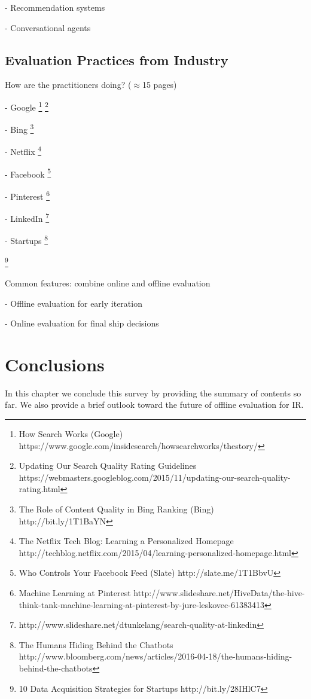 \documentclass[openany]{now} %
\newcommand{\newpar}{\bigskip\noindent}
\begin{document}
- Recommendation systems \cite{gunawardana2015evaluating}

- Conversational agents

\section{Evaluation Practices from Industry}

How are the practitioners doing? (\ensuremath{\approx}15 pages)

- Google \footnote{How Search Works (Google) https://www.google.com/insidesearch/howsearchworks/thestory/} \footnote{Updating Our Search Quality Rating Guidelines
	 https://webmasters.googleblog.com/2015/11/updating-our-search-quality-rating.html}

- Bing \footnote{The Role of Content Quality in Bing Ranking (Bing)
	 http://bit.ly/1T1BaYN}

- Netflix \cite{Gomez-Uribe2015}  \footnote{The Netflix Tech Blog: Learning a Personalized Homepage
	http://techblog.netflix.com/2015/04/learning-personalized-homepage.html}

- Facebook \footnote{Who Controls Your Facebook Feed (Slate) http://slate.me/1T1BbvU}

- Pinterest \footnote{Machine Learning at Pinterest http://www.slideshare.net/HiveData/the-hive-think-tank-machine-learning-at-pinterest-by-jure-leskovec-61383413}

- LinkedIn \footnote{http://www.slideshare.net/dtunkelang/search-quality-at-linkedin}

- Startups \footnote{The Humans Hiding Behind the Chatbots http://www.bloomberg.com/news/articles/2016-04-18/the-humans-hiding-behind-the-chatbots}

\footnote{10 Data Acquisition Strategies for Startups http://bit.ly/28IHlC7}

\newpar
Common features: combine online and offline evaluation

- Offline evaluation for early iteration

- Online evaluation for final ship decisions

\chapter{Conclusions}

In this chapter we conclude this survey by providing the summary of contents so far. 
We also provide a brief outlook toward the future of offline evaluation for IR.
\end{document}
